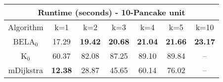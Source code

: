 \begin{tabular}{c|cccccc}\toprule
\multicolumn{7}{c}{Runtime (seconds) - 10-Pancake unit}\\ \midrule
Algorithm & k=1 & k=2 & k=3 & k=4 & k=5 & k=10 \\ \midrule
BELA$_0$ & 17.29 & \textbf{19.42} & \textbf{20.68} & \textbf{21.04} & \textbf{21.66} & \textbf{23.17} \\
K$_0$ & 60.37 & 82.08 & 87.25 & 89.10 & 89.84 & -- \\
mDijkstra & \textbf{12.38} & 28.87 & 45.65 & 60.14 & 76.02 & -- \\ \bottomrule 
\end{tabular}
